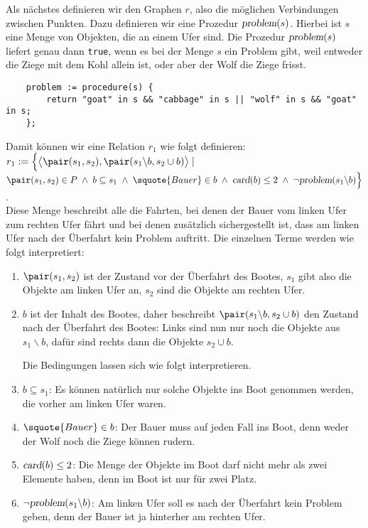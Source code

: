Als nächstes definieren wir den Graphen $r$, also die möglichen Verbindungen zwischen
Punkten.  Dazu definieren wir eine Prozedur $\textsl{problem}(s)$. Hierbei ist $s$ eine
Menge von Objekten, die an einem Ufer sind.  Die Prozedur $\textsl{problem}(s)$
liefert genau dann \texttt{true}, wenn es bei der  Menge $s$ ein Problem gibt, weil entweder die Ziege
mit dem Kohl allein ist, oder aber der Wolf die Ziege frisst.
\begin{verbatim}
    problem := procedure(s) {
        return "goat" in s && "cabbage" in s || "wolf" in s && "goat" in s;
    };
\end{verbatim}
Damit können wir eine Relation $r_1$ wie folgt definieren:
\\[0.2cm]
\hspace*{1.3cm} 
$r_1 := \Bigl\{ \bigl\langle \pair(s_1, s_2), \pair(s_1 \backslash b, s_2 \cup b)
  \bigr\rangle \;|\; $ \\
\hspace*{2.3cm} 
$\pair(s_1, s_2) \in P \;\wedge\; b \subseteq s_1 \;\wedge\;
 \squote{Bauer} \in b \;\wedge\; \textsl{card}(b) \leq 2 \;\wedge\; \neg\textsl{problem}(s_1 \backslash b) \Bigr\}$.
\\[0.2cm]
Diese Menge beschreibt alle die Fahrten, bei denen der Bauer vom linken Ufer zum rechten Ufer
fährt und bei denen zusätzlich sichergestellt ist, dass am linken Ufer
nach der Überfahrt kein Problem auftritt.  Die einzelnen Terme werden wie folgt
interpretiert:
\begin{enumerate}
\item $\pair(s_1,s_2)$ ist der Zustand vor der Überfahrt des Bootes,
      $s_1$ gibt also die Objekte am linken Ufer an, $s_2$ sind die Objekte am rechten Ufer.
\item $b$ ist der Inhalt des Bootes, daher beschreibt 
       $\pair(s_1 \backslash b, s_2 \cup b)$ den Zustand nach der Überfahrt des Bootes:
       Links sind nun nur noch die Objekte aus $s_1 \backslash b$, dafür sind rechts dann 
       die Objekte $s_2 \cup b$.

       Die Bedingungen lassen sich wie folgt interpretieren.
\item $b \subseteq s_1$: Es können natürlich nur solche Objekte ins Boot genommen werden,
       die vorher am linken Ufer waren.
\item $\squote{Bauer} \in b$: Der Bauer muss auf jeden Fall ins Boot, denn weder der Wolf
       noch die Ziege können rudern.
\item $\textsl{card}(b) \leq 2$: Die Menge der Objekte im Boot darf nicht mehr als zwei
       Elemente haben, denn im Boot ist nur für zwei Platz.
\item $\neg\textsl{problem}(s_1 \backslash b)$:  Am linken Ufer soll es nach der Überfahrt
       kein Problem geben, denn der Bauer ist ja hinterher am rechten Ufer.
\end{enumerate}
